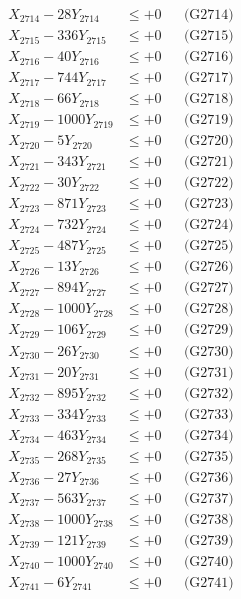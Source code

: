 \documentclass[a4paper,10pt]{article}
\begin{document}
{\begin{align}
X_{2714} - 28Y_{2714} &\leq +0 && \text{(G2714)} \\
X_{2715} - 336Y_{2715} &\leq +0 && \text{(G2715)} \\
X_{2716} - 40Y_{2716} &\leq +0 && \text{(G2716)} \\
X_{2717} - 744Y_{2717} &\leq +0 && \text{(G2717)} \\
X_{2718} - 66Y_{2718} &\leq +0 && \text{(G2718)} \\
X_{2719} - 1000Y_{2719} &\leq +0 && \text{(G2719)} \\
X_{2720} - 5Y_{2720} &\leq +0 && \text{(G2720)} \\
\allowbreak
X_{2721} - 343Y_{2721} &\leq +0 && \text{(G2721)} \\
X_{2722} - 30Y_{2722} &\leq +0 && \text{(G2722)} \\
X_{2723} - 871Y_{2723} &\leq +0 && \text{(G2723)} \\
X_{2724} - 732Y_{2724} &\leq +0 && \text{(G2724)} \\
X_{2725} - 487Y_{2725} &\leq +0 && \text{(G2725)} \\
X_{2726} - 13Y_{2726} &\leq +0 && \text{(G2726)} \\
X_{2727} - 894Y_{2727} &\leq +0 && \text{(G2727)} \\
X_{2728} - 1000Y_{2728} &\leq +0 && \text{(G2728)} \\
X_{2729} - 106Y_{2729} &\leq +0 && \text{(G2729)} \\
X_{2730} - 26Y_{2730} &\leq +0 && \text{(G2730)} \\
\allowbreak
X_{2731} - 20Y_{2731} &\leq +0 && \text{(G2731)} \\
X_{2732} - 895Y_{2732} &\leq +0 && \text{(G2732)} \\
X_{2733} - 334Y_{2733} &\leq +0 && \text{(G2733)} \\
X_{2734} - 463Y_{2734} &\leq +0 && \text{(G2734)} \\
X_{2735} - 268Y_{2735} &\leq +0 && \text{(G2735)} \\
X_{2736} - 27Y_{2736} &\leq +0 && \text{(G2736)} \\
X_{2737} - 563Y_{2737} &\leq +0 && \text{(G2737)} \\
X_{2738} - 1000Y_{2738} &\leq +0 && \text{(G2738)} \\
X_{2739} - 121Y_{2739} &\leq +0 && \text{(G2739)} \\
X_{2740} - 1000Y_{2740} &\leq +0 && \text{(G2740)} \\
\allowbreak
X_{2741} - 6Y_{2741} &\leq +0 && \text{(G2741)} \\

\end{align}}
\end{document}

